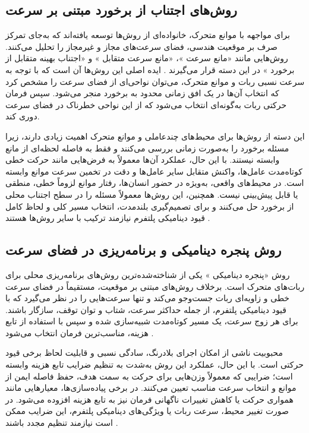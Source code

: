 \subsection{روش‌های اجتناب از برخورد مبتنی بر سرعت}

برای مواجهه با موانع متحرک، خانواده‌ای از روش‌ها توسعه یافته‌اند که به‌جای تمرکز صرف بر موقعیت هندسی، فضای سرعت‌های مجاز و غیرمجاز را تحلیل می‌کنند. روش‌هایی مانند «مانع سرعت%
»،
«مانع سرعت متقابل%
»
و «اجتناب بهینه متقابل از برخورد%
»
در این دسته قرار می‌گیرند%
\cite{Fiorini1998VO,VanDenBerg2008RVO,VanDenBerg2011ORCA}.
ایده اصلی این روش‌ها آن است که با توجه به سرعت نسبی ربات و موانع متحرک، می‌توان نواحی‌ای از فضای سرعت را مشخص کرد که انتخاب آن‌ها در یک افق زمانی محدود به برخورد منجر می‌شود. سپس فرمان حرکتی ربات به‌گونه‌ای انتخاب می‌شود که از این نواحی خطرناک در فضای سرعت دوری کند.

این دسته از روش‌ها برای محیط‌های چندعاملی و موانع متحرک اهمیت زیادی دارند، زیرا مسئله برخورد را به‌صورت زمانی بررسی می‌کنند و فقط به فاصله لحظه‌ای از مانع وابسته نیستند. با این حال، عملکرد آن‌ها معمولاً به فرض‌هایی مانند حرکت خطی کوتاه‌مدت عامل‌ها، واکنش متقابل سایر عامل‌ها و دقت در تخمین سرعت موانع وابسته است. در محیط‌های واقعی، به‌ویژه در حضور انسان‌ها، رفتار موانع لزوماً خطی، منطقی یا قابل پیش‌بینی نیست. همچنین، این روش‌ها معمولاً مسئله را در سطح اجتناب محلی از برخورد حل می‌کنند و برای تصمیم‌گیری بلندمدت، انتخاب مسیر کلی و لحاظ کامل قیود دینامیکی پلتفرم نیازمند ترکیب با سایر روش‌ها هستند%
\cite{Fiorini1998VO,VanDenBerg2008RVO,VanDenBerg2011ORCA,LaValle2006Planning}.

\subsection{روش پنجره دینامیکی و برنامه‌ریزی در فضای سرعت}

روش «پنجره دینامیکی%
»
یکی از شناخته‌شده‌ترین روش‌های برنامه‌ریزی محلی برای ربات‌های متحرک است. برخلاف روش‌های مبتنی بر موقعیت،  مستقیماً در فضای سرعت خطی و زاویه‌ای ربات جست‌وجو می‌کند و تنها سرعت‌هایی را در نظر می‌گیرد که با قیود دینامیکی پلتفرم، از جمله حداکثر سرعت، شتاب و توان توقف، سازگار باشند. برای هر زوج سرعت، یک مسیر کوتاه‌مدت شبیه‌سازی شده و سپس با استفاده از تابع هزینه، مناسب‌ترین فرمان انتخاب می‌شود%
\cite{fox1997dwa}.

محبوبیت  ناشی از امکان اجرای بلادرنگ، سادگی نسبی و قابلیت لحاظ برخی قیود حرکتی است. با این حال، عملکرد این روش به‌شدت به تنظیم ضرایب تابع هزینه وابسته است؛ ضرایبی که معمولاً وزن‌هایی برای حرکت به سمت هدف، حفظ فاصله ایمن از موانع و انتخاب سرعت مناسب تعیین می‌کنند. در برخی پیاده‌سازی‌ها، معیارهایی مانند همواری حرکت یا کاهش تغییرات ناگهانی فرمان نیز به تابع هزینه افزوده می‌شود. در صورت تغییر محیط، سرعت ربات یا ویژگی‌های دینامیکی پلتفرم، این ضرایب ممکن است نیازمند تنظیم مجدد باشند%
\cite{fox1997dwa,LaValle2006Planning,Choset2005Principles}.

